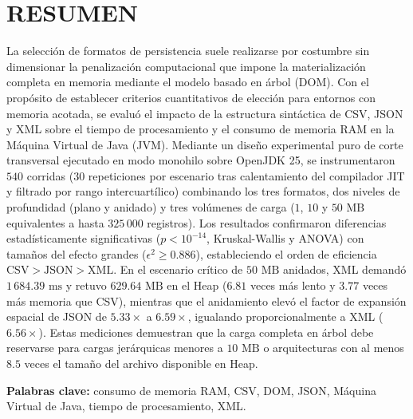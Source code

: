 \section*{RESUMEN}

La selección de formatos de persistencia suele realizarse por costumbre sin dimensionar la penalización computacional que impone la materialización completa en memoria mediante el modelo basado en árbol (DOM). Con el propósito de establecer criterios cuantitativos de elección para entornos con memoria acotada, se evaluó el impacto de la estructura sintáctica de CSV, JSON y XML sobre el tiempo de procesamiento y el consumo de memoria RAM en la Máquina Virtual de Java (JVM). Mediante un diseño experimental puro de corte transversal ejecutado en modo monohilo sobre OpenJDK 25, se instrumentaron $540$ corridas ($30$ repeticiones por escenario tras calentamiento del compilador JIT y filtrado por rango intercuartílico) combinando los tres formatos, dos niveles de profundidad (plano y anidado) y tres volúmenes de carga ($1$, $10$ y $50\text{ MB}$ equivalentes a hasta $325\,000$ registros). Los resultados confirmaron diferencias estadísticamente significativas ($p < 10^{-14}$, Kruskal-Wallis y ANOVA) con tamaños del efecto grandes ($\epsilon^{2} \ge 0.886$), estableciendo el orden de eficiencia $\text{CSV} > \text{JSON} > \text{XML}$. En el escenario crítico de $50\text{ MB}$ anidados, XML demandó $1\,684.39\text{ ms}$ y retuvo $629.64\text{ MB}$ en el Heap ($6.81$ veces más lento y $3.77$ veces más memoria que CSV), mientras que el anidamiento elevó el factor de expansión espacial de JSON de $5.33\times$ a $6.59\times$, igualando proporcionalmente a XML ($6.56\times$). Estas mediciones demuestran que la carga completa en árbol debe reservarse para cargas jerárquicas menores a $10\text{ MB}$ o arquitecturas con al menos $8.5$ veces el tamaño del archivo disponible en Heap.

\vspace{0.5cm}
\noindent\textbf{Palabras clave:} consumo de memoria RAM, CSV, DOM, JSON, Máquina Virtual de Java, tiempo de procesamiento, XML.